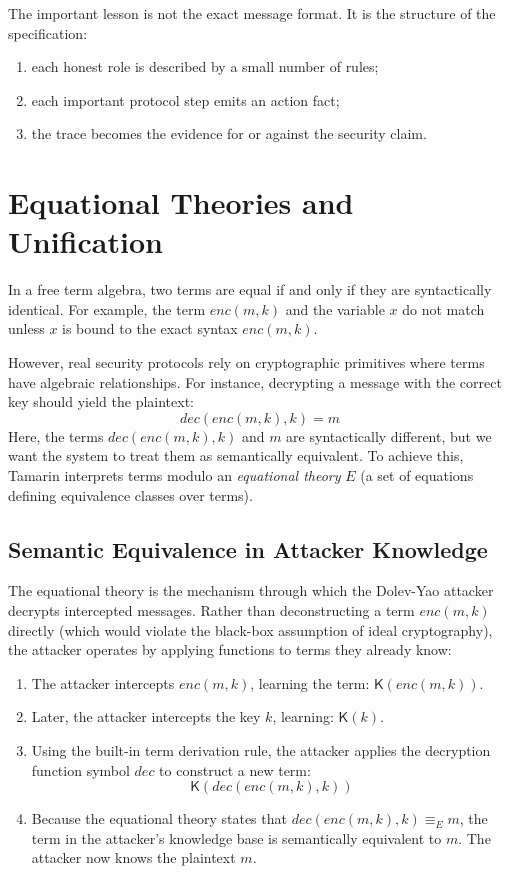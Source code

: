 \medskip\noindent
The important lesson is not the exact message format.  It is the structure of
the specification:
\begin{enumerate}
  \item each honest role is described by a small number of rules;
  \item each important protocol step emits an action fact;
  \item the trace becomes the evidence for or against the security claim.
\end{enumerate}


\section{Equational Theories and Unification}
\label{sec:tamarin-unification}

In a free term algebra, two terms are equal if and only if they are syntactically identical. For example, the term $enc(m, k)$ and the variable $x$ do not match unless $x$ is bound to the exact syntax $enc(m, k)$.

However, real security protocols rely on cryptographic primitives where terms have algebraic relationships. For instance, decrypting a message with the correct key should yield the plaintext:
\[
  dec(enc(m, k), k) = m
\]
Here, the terms $dec(enc(m, k), k)$ and $m$ are syntactically different, but we want the system to treat them as semantically equivalent. To achieve this, Tamarin interprets terms modulo an \emph{equational theory} $E$ (a set of equations defining equivalence classes over terms).

\subsection{Semantic Equivalence in Attacker Knowledge}

The equational theory is the mechanism through which the Dolev-Yao attacker decrypts intercepted messages. Rather than deconstructing a term $enc(m, k)$ directly (which would violate the black-box assumption of ideal cryptography), the attacker operates by applying functions to terms they already know:
\begin{enumerate}
  \item The attacker intercepts $enc(m, k)$, learning the term: $\mathsf{K}(enc(m, k))$.
  \item Later, the attacker intercepts the key $k$, learning: $\mathsf{K}(k)$.
  \item Using the built-in term derivation rule, the attacker applies the decryption function symbol $dec$ to construct a new term:
  \[
    \mathsf{K}(dec(enc(m, k), k))
  \]
  \item Because the equational theory states that $dec(enc(m, k), k) \equiv_E m$, the term in the attacker's knowledge base is semantically equivalent to $m$. The attacker now knows the plaintext $m$.
\end{enumerate}

